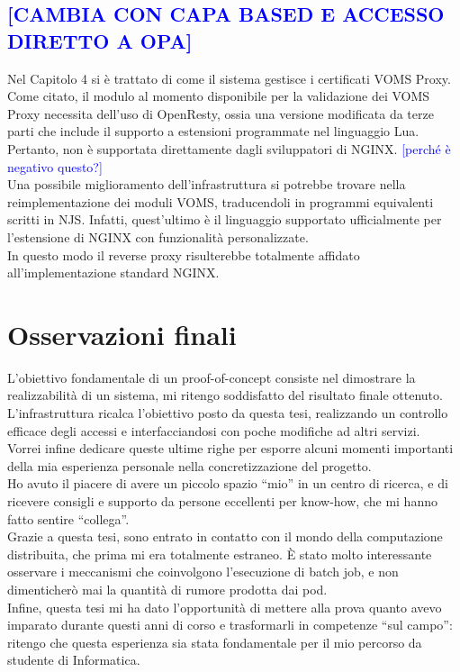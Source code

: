 \subsection{\textcolor{blue}{[CAMBIA CON CAPA BASED E ACCESSO DIRETTO A OPA]}}
Nel Capitolo 4 si è trattato di come il sistema gestisce i certificati VOMS Proxy. 
Come citato, il modulo al momento disponibile per la validazione dei VOMS Proxy necessita dell'uso di OpenResty, 
ossia una versione modificata da terze 
parti che include il supporto a estensioni programmate nel linguaggio Lua. Pertanto, non è supportata direttamente dagli sviluppatori di NGINX. 
\textcolor{blue}{[perché è negativo questo?]}
\\  Una possibile miglioramento dell'infrastruttura si potrebbe trovare nella reimplementazione dei moduli VOMS, 
traducendoli in programmi equivalenti scritti in NJS. Infatti, quest'ultimo è il linguaggio supportato ufficialmente per 
l'estensione di NGINX con funzionalità personalizzate.  
\\ In questo modo il reverse proxy 
risulterebbe totalmente affidato all'implementazione standard NGINX.

\section{Osservazioni finali}
L'obiettivo fondamentale di un proof-of-concept consiste nel dimostrare la realizzabilità 
di un sistema, mi ritengo soddisfatto del risultato finale ottenuto. L'infrastruttura ricalca l'obiettivo 
posto da questa tesi, realizzando un controllo efficace degli accessi e interfacciandosi 
con poche modifiche ad altri servizi.  
\\Vorrei infine dedicare queste ultime righe per esporre alcuni momenti importanti della mia esperienza personale nella concretizzazione del progetto. 
\\ Ho avuto il piacere di avere un piccolo spazio “mio” in un centro di ricerca, e di ricevere consigli e supporto da persone eccellenti per know-how, che mi hanno fatto sentire “collega”.
\\ Grazie a questa tesi, sono entrato in contatto con il mondo della computazione distribuita, che prima mi era totalmente estraneo. 
È stato molto interessante osservare i meccanismi che coinvolgono l'esecuzione di batch job, e non dimenticherò mai 
la quantità di rumore prodotta dai pod.   
\\ Infine, questa tesi mi ha dato l'opportunità di mettere alla prova quanto avevo
imparato durante questi anni di corso e trasformarli in competenze “sul campo”:
 ritengo che questa esperienza sia stata fondamentale per il mio percorso da studente di Informatica.  